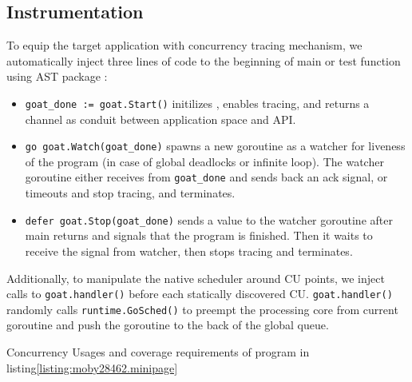 \subsection{Instrumentation}
\label{sec:dl_instrument}

To equip the target application with concurrency tracing mechanism, we automatically inject three lines of code to the beginning of main or test function using AST package \cite{go-package-ast}:

\begin{itemize}
  \item \texttt{goat\_done := goat.Start()} initilizes \goat, enables tracing, and returns a channel as conduit between application space and \goat API.
  \item \texttt{go goat.Watch(goat\_done)} spawns a new goroutine as a watcher for liveness of the program (in case of global deadlocks or infinite loop). The watcher goroutine either receives from \texttt{goat\_done} and sends back an ack signal, or timeouts and stop tracing, and terminates.
  \item \texttt{defer goat.Stop(goat\_done)} sends a value to the watcher goroutine after main returns and signals that the program is finished. Then it waits to receive the signal from watcher, then stops tracing and terminates.
\end{itemize}

Additionally, to manipulate the native scheduler around CU points, we inject calls to \texttt{goat.handler()} before each statically discovered CU. \texttt{goat.handler()} randomly calls \texttt{runtime.GoSched()} to preempt the processing core from current goroutine and push the goroutine to the back of the global queue.



\begin{table}[]
\centering
\caption{Concurrency Usages and coverage requirements of program in listing\ref{listing:moby28462.minipage}}
\scalebox{0.9}{

}
\label{tab:moby_cov_table}
\end{table}


